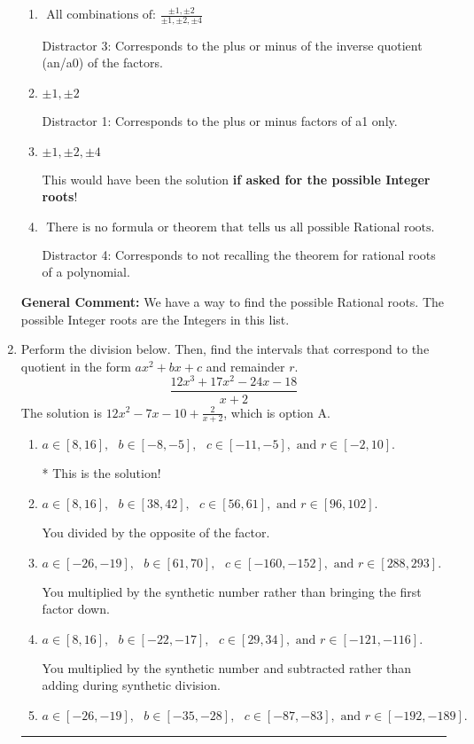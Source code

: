 \documentclass{extbook}[14pt]
\newcommand{\litem}[1]{\item #1

\rule{\textwidth}{0.4pt}}
\begin{document}
\begin{enumerate}
{\begin{enumerate}[label=\Alph*.]
* This is the solution \textbf{since we asked for the possible Rational roots}!
\item \( \text{ All combinations of: }\frac{\pm 1,\pm 2}{\pm 1,\pm 2,\pm 4} \)

 Distractor 3: Corresponds to the plus or minus of the inverse quotient (an/a0) of the factors. 
\item \( \pm 1,\pm 2 \)

 Distractor 1: Corresponds to the plus or minus factors of a1 only.
\item \( \pm 1,\pm 2,\pm 4 \)

This would have been the solution \textbf{if asked for the possible Integer roots}!
\item \( \text{ There is no formula or theorem that tells us all possible Rational roots.} \)

 Distractor 4: Corresponds to not recalling the theorem for rational roots of a polynomial.
\end{enumerate}

\textbf{General Comment:} We have a way to find the possible Rational roots. The possible Integer roots are the Integers in this list.
}
\litem{
Perform the division below. Then, find the intervals that correspond to the quotient in the form $ax^2+bx+c$ and remainder $r$.
\[ \frac{12x^{3} +17 x^{2} -24 x -18}{x + 2} \]The solution is \( 12x^{2} -7 x -10 + \frac{2}{x + 2} \), which is option A.\begin{enumerate}[label=\Alph*.]
\item \( a \in [8, 16], \text{   } b \in [-8, -5], \text{   } c \in [-11, -5], \text{   and   } r \in [-2, 10]. \)

* This is the solution!
\item \( a \in [8, 16], \text{   } b \in [38, 42], \text{   } c \in [56, 61], \text{   and   } r \in [96, 102]. \)

 You divided by the opposite of the factor.
\item \( a \in [-26, -19], \text{   } b \in [61, 70], \text{   } c \in [-160, -152], \text{   and   } r \in [288, 293]. \)

 You multiplied by the synthetic number rather than bringing the first factor down.
\item \( a \in [8, 16], \text{   } b \in [-22, -17], \text{   } c \in [29, 34], \text{   and   } r \in [-121, -116]. \)

 You multiplied by the synthetic number and subtracted rather than adding during synthetic division.
\item \( a \in [-26, -19], \text{   } b \in [-35, -28], \text{   } c \in [-87, -83], \text{   and   } r \in [-192, -189]. \)


\end{enumerate}}
\end{enumerate}
\end{document}
